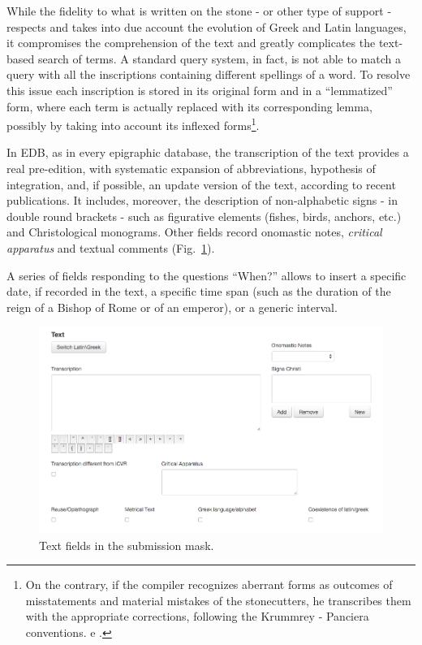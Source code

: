 \documentclass[amsthm,ebook]{saparticle}
\begin{document}
While the fidelity to what is written on the stone - or other type of support - respects and takes into due account the
evolution of Greek and Latin languages, it compromises the comprehension of the text and greatly complicates the
text-based search of terms. A standard query system, in fact, is not able to match a query with all the inscriptions
containing different spellings of a word. To resolve this issue each inscription is stored in its original form and in
a ``lemmatized'' form, where each term is actually replaced with its corresponding lemma, possibly by taking into account
its inflexed forms\footnote{ On the contrary, if the compiler recognizes aberrant forms as outcomes of misstatements
and material mistakes of the stonecutters, he transcribes them with the appropriate corrections, following the Krummrey
- Panciera conventions. \citet{felle_perspectives_2014} e \citet{orlandi_improving_2014}.}.

In EDB, as in every epigraphic database, the transcription of the text provides a real pre-edition, with systematic
expansion of abbreviations, hypothesis of integration, and, if possible, an update version of the text, according to
recent publications. It includes, moreover, the description of non-alphabetic signs - in double round brackets - such
as figurative elements (fishes, birds, anchors, etc.) and Christological monograms. Other fields record onomastic
notes, \emph{critical apparatus} and textual comments (Fig.~\ref{fig:10}). 

A series of fields responding to the questions “When?” allows to insert a specific date, if recorded in the text, a
specific time span (such as the duration of the reign of a Bishop of Rome or of an emperor), or a generic interval.

\newpage

\begin{figure}[!hbp]
\centering
 \includegraphics[width=\columnwidth]{EAGLE2016Roccoengrev-img010.png}
\caption{Text fields in the submission mask.}
\label{fig:10}
\end{figure}
\end{document}
